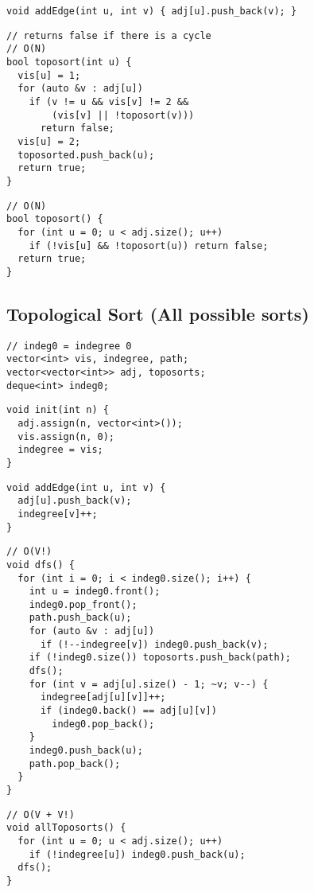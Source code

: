 \documentclass[twoside]{article}
\begin{document}
\begin{multicols*}{2}
\begin{verbatim}
void addEdge(int u, int v) { adj[u].push_back(v); }
\end{verbatim}
\vspace{-12pt}
\begin{verbatim}
// returns false if there is a cycle
// O(N)
bool toposort(int u) {
  vis[u] = 1;
  for (auto &v : adj[u])
    if (v != u && vis[v] != 2 &&
        (vis[v] || !toposort(v)))
      return false;
  vis[u] = 2;
  toposorted.push_back(u);
  return true;
}
\end{verbatim}
\vspace{-12pt}
\begin{verbatim}
// O(N)
bool toposort() {
  for (int u = 0; u < adj.size(); u++)
    if (!vis[u] && !toposort(u)) return false;
  return true;
}
\end{verbatim}

\subsectionfont{\large\bfseries\sffamily\underline}
\subsection*{Topological Sort (All possible sorts)}
\begin{verbatim}
// indeg0 = indegree 0
vector<int> vis, indegree, path;
vector<vector<int>> adj, toposorts;
deque<int> indeg0;
\end{verbatim}
\vspace{-12pt}
\begin{verbatim}
void init(int n) {
  adj.assign(n, vector<int>());
  vis.assign(n, 0);
  indegree = vis;
}
\end{verbatim}
\vspace{-12pt}
\begin{verbatim}
void addEdge(int u, int v) {
  adj[u].push_back(v);
  indegree[v]++;
}
\end{verbatim}
\vspace{-12pt}
\begin{verbatim}
// O(V!)
void dfs() {
  for (int i = 0; i < indeg0.size(); i++) {
    int u = indeg0.front();
    indeg0.pop_front();
    path.push_back(u);
    for (auto &v : adj[u])
      if (!--indegree[v]) indeg0.push_back(v);
    if (!indeg0.size()) toposorts.push_back(path);
    dfs();
    for (int v = adj[u].size() - 1; ~v; v--) {
      indegree[adj[u][v]]++;
      if (indeg0.back() == adj[u][v])
        indeg0.pop_back();
    }
    indeg0.push_back(u);
    path.pop_back();
  }
}
\end{verbatim}
\vspace{-12pt}
\begin{verbatim}
// O(V + V!)
void allToposorts() {
  for (int u = 0; u < adj.size(); u++)
    if (!indegree[u]) indeg0.push_back(u);
  dfs();
}
\end{verbatim}


\end{multicols*}
\end{document}
